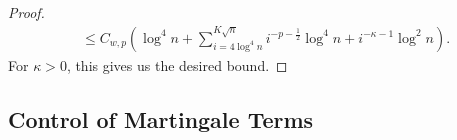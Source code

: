 \documentclass[twoside,12pt, a4paper]{article}
\numberwithin{equation}{section}
\theoremstyle{remark}
\begin{document}
\begin{proof}
\begin{align*}
			&\le C_{w, p} \left(\log^4 n + \sum_{i = 4 \log^4 n}^{K \sqrt{n} } i^{- p - \frac{1}{2}} \log^4 n + i^{- \kappa - 1 } \log^2 n \right)
			.\end{align*} 
		For $\kappa>0$, this gives us the desired bound.
	\end{proof}
	
	
	\subsection{Control of Martingale Terms } 
\end{document}
